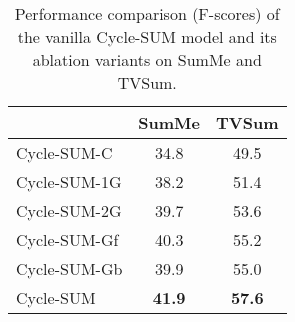 \documentclass[letterpaper]{article} \usepackage{aaai19}  \usepackage{times}  \usepackage{helvet}  \usepackage{courier}  \usepackage{url}  \usepackage{graphicx}  \frenchspacing  \setlength{\pdfpagewidth}{8.5in}  \setlength{\pdfpageheight}{11in}  \usepackage{amsmath}
\begin{document}
\begin{table}
\setlength{\belowcaptionskip}{3pt}
\begin{center}
\fontsize{8pt}{12pt}\selectfont
\caption{ Performance comparison (F-scores) of the vanilla Cycle-SUM model and its ablation variants on SumMe and TVSum.}
\begin{tabular}{l|c|c}
\toprule
 & SumMe &TVSum \\
 \midrule
Cycle-SUM-C &34.8 & 49.5 \\
 Cycle-SUM-1G &38.2 & 51.4\\
 Cycle-SUM-2G &39.7 & 53.6\\
 Cycle-SUM-Gf&40.3 & 55.2\\
 Cycle-SUM-Gb&39.9 & 55.0\\
Cycle-SUM & \textbf{41.9}  & \textbf{57.6}\\
 \bottomrule
\end{tabular}
\label{tab:ablation}
\end{center}
\end{table}
\end{document}
